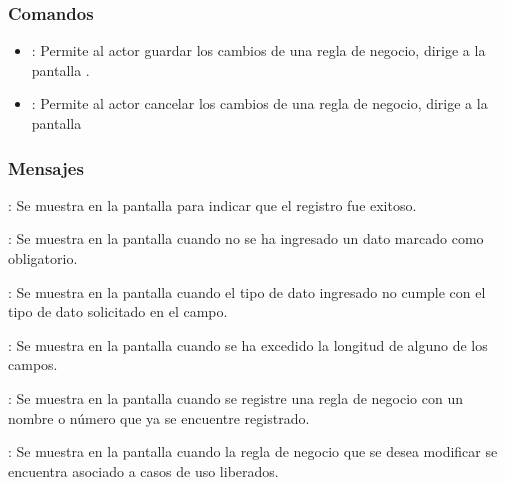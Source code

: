 \subsubsection{Comandos}
\begin{itemize}
	\item {}: Permite al actor guardar los cambios de una regla de negocio, dirige a la pantalla .
	\item {}: Permite al actor cancelar los cambios de una regla de negocio, dirige a la pantalla 
\end{itemize}

\subsubsection{Mensajes}

\begin{Citemize}
	\item {}: Se muestra en la pantalla  para indicar que el registro fue exitoso.
	\item {}: Se muestra en la pantalla  cuando no se ha ingresado un dato marcado como obligatorio.
	\item {}: Se muestra en la pantalla  cuando el tipo de dato ingresado no cumple con el tipo de dato solicitado en el campo.
	\item {}: Se muestra en la pantalla  cuando se ha excedido la longitud de alguno de los campos.
	\item {}: Se muestra en la pantalla  cuando se registre una regla de negocio con un nombre o número que ya se encuentre registrado.
	\item {}: Se muestra en la pantalla  cuando la regla de negocio que se desea modificar se encuentra asociado a casos de uso liberados.
\end{Citemize}
